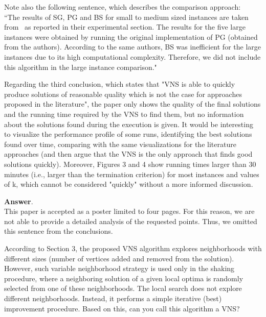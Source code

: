 \documentclass [11pt]{scrartcl}
\begin{document}
\begin{enumerate}
	Note also the following sentence, which describes the comparison approach:\\
	``The results of SG, PG and BS for small to medium sized instances are taken from~\cite{corcoran2021heuristics} as reported in their experimental section. The results for the five large instances were obtained by running the original implementation of PG (obtained from the authors). According to the same authors, BS was inefficient for the large instances due to its high computational complexity. Therefore, we did not include this algorithm in the large instance comparison."
	
	\textbf{Answer}. \\
	This paper is accepted as a poster limited to four pages. For this reason, we are not able to provide a detailed analysis of the requested points. Thus, we omitted this sentence from the conclusions. 
\end{enumerate}

\begin{leftbar}	
According to Section 3, the proposed VNS algorithm explores neighborhoods with different sizes (number of vertices added and removed from the solution). However, such variable neighborhood strategy is used only in the shaking procedure, where a neighboring solution of a given local optima is randomly selected from one of these neighborhoods. The local search does not explore different neighborhoods. Instead, it performs a simple iterative (best) improvement procedure. Based on this, can you call this algorithm a VNS?
\end{leftbar}
\end{document}
